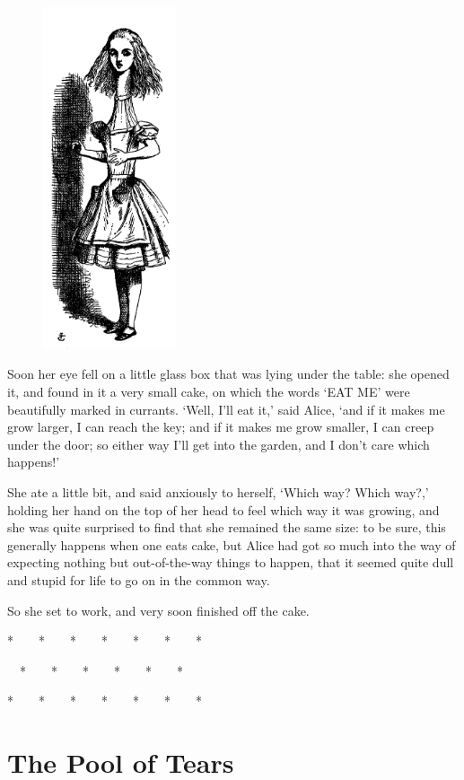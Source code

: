 \documentclass[12pt,openany]{memoir}
\newcommand{\sectionbreak}{
\vspace{0.1cm}
\begin{center}
*~~~~*~~~~*~~~~*~~~~*~~~~*~~~~*

~~*~~~~*~~~~*~~~~*~~~~*~~~~*~~~

*~~~~*~~~~*~~~~*~~~~*~~~~*~~~~*
\end{center}
\vspace{-0.2cm}
}
\begin{document}
\begin{figure}
  \includegraphics[width=0.35\textwidth]{illustrations/pic_05.jpg}
\end{figure}

Soon her eye fell on a little glass box that was lying under the table: she opened it, and found in it a very small cake, on which the words `EAT ME' were beautifully marked in currants. `Well, I'll eat it,' said Alice, `and if it makes me grow larger, I can reach the key; and if it makes me grow smaller, I can creep under the door; so either way I'll get into the garden, and I don't care which happens!'

She ate a little bit, and said anxiously to herself, `Which way? Which way?,' holding her hand on the top of her head to feel which way it was growing, and she was quite surprised to find that she remained the same size: to be sure, this generally happens when one eats cake, but Alice had got so much into the way of expecting nothing but out-of-the-way things to happen, that it seemed quite dull and stupid for life to go on in the common way.

So she set to work, and very soon finished off the cake.

\sectionbreak


\chapter{The Pool of Tears}
\end{document}
